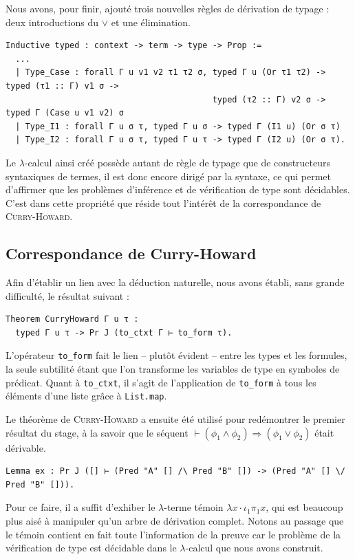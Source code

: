 \documentclass[a4paper]{article}
\theoremstyle{remark}
\theoremstyle{remark}
\theoremstyle{remark}
\theoremstyle{definition}
\theoremstyle{definition}
\theoremstyle{definition}
\begin{document}
Nous avons, pour finir, ajouté trois nouvelles règles de dérivation de typage : deux introductions du $\vee$ et une élimination.
\begin{verbatim}
Inductive typed : context -> term -> type -> Prop :=
  ...
  | Type_Case : forall Γ u v1 v2 τ1 τ2 σ, typed Γ u (Or τ1 τ2) -> typed (τ1 :: Γ) v1 σ ->
                                          typed (τ2 :: Γ) v2 σ -> typed Γ (Case u v1 v2) σ
  | Type_I1 : forall Γ u σ τ, typed Γ u σ -> typed Γ (I1 u) (Or σ τ)
  | Type_I2 : forall Γ u σ τ, typed Γ u τ -> typed Γ (I2 u) (Or σ τ).
\end{verbatim}
\smallskip

Le $\lambda$-calcul ainsi créé possède autant de règle de typage que de constructeurs syntaxiques de termes, il est donc encore dirigé par la syntaxe, ce qui permet d'affirmer que les problèmes d'inférence et de vérification de type sont décidables. C'est dans cette propriété que réside tout l'intérêt de la correspondance de \textsc{Curry-Howard}.

\subsection{Correspondance de {\sc Curry-Howard}}

Afin d'établir un lien avec la déduction naturelle, nous avons établi, sans grande difficulté, le résultat suivant :
\begin{verbatim}
Theorem CurryHoward Γ u τ :
  typed Γ u τ -> Pr J (to_ctxt Γ ⊢ to_form τ).
\end{verbatim}
L'opérateur \verb+to_form+ fait le lien -- plutôt évident -- entre les types et les formules, la seule subtilité étant que l'on transforme les variables de type en symboles de prédicat. Quant à \verb+to_ctxt+, il s'agit de l'application de \verb+to_form+ à tous les éléments d'une liste grâce à \verb+List.map+.
\smallskip

Le théorème de \textsc{Curry-Howard} a ensuite été utilisé pour redémontrer le premier résultat du stage, à la savoir que le séquent $\vdash (\phi_1 \wedge \phi_2) \Rightarrow (\phi_1 \vee \phi_2)$ était dérivable.
\begin{verbatim}
Lemma ex : Pr J ([] ⊢ (Pred "A" [] /\ Pred "B" []) -> (Pred "A" [] \/ Pred "B" [])).
\end{verbatim}
Pour ce faire, il a suffit d'exhiber le $\lambda$-terme témoin $\lambda x \cdot \iota_1 \pi_1 x$, qui est beaucoup plus aisé à manipuler qu'un arbre de dérivation complet. Notons au passage que le témoin contient en fait toute l'information de la preuve car le problème de la vérification de type est décidable dans le $\lambda$-calcul que nous avons construit.
\end{document}

